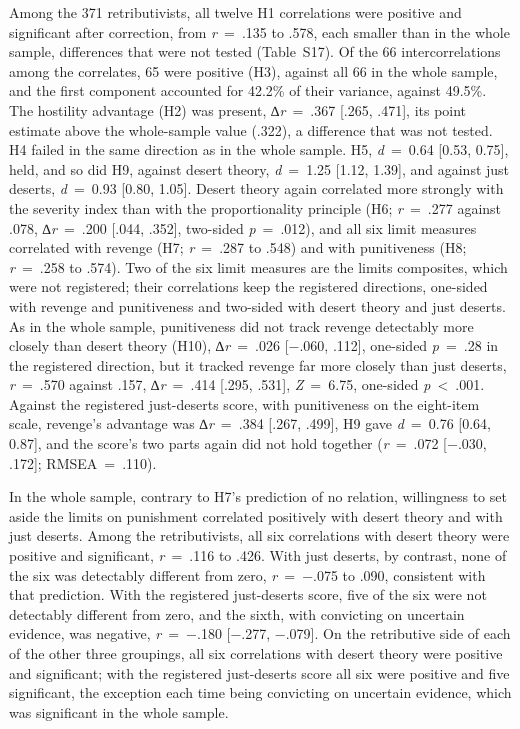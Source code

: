 Among the 371 retributivists, all twelve H1 correlations were positive and significant after correction, from \emph{r}~=~.135 to .578, each smaller than in the whole sample, differences that were not tested (Table~S17). Of the 66 intercorrelations among the correlates, 65 were positive (H3), against all 66 in the whole sample, and the first component accounted for 42.2\% of their variance, against 49.5\%. The hostility advantage (H2) was present, ∆\emph{r}~=~.367 {[}.265, .471{]}, its point estimate above the whole-sample value (.322), a difference that was not tested. H4 failed in the same direction as in the whole sample. H5, \emph{d}~=~0.64 {[}0.53, 0.75{]}, held, and so did H9, against desert theory, \emph{d}~=~1.25 {[}1.12, 1.39{]}, and against just deserts, \emph{d}~=~0.93 {[}0.80, 1.05{]}. Desert theory again correlated more strongly with the severity index than with the proportionality principle (H6; \emph{r}~=~.277 against .078, ∆\emph{r}~=~.200 {[}.044, .352{]}, two-sided \emph{p}~=~.012), and all six limit measures correlated with revenge (H7; \emph{r}~=~.287 to .548) and with punitiveness (H8; \emph{r}~=~.258 to .574). Two of the six limit measures are the limits composites, which were not registered; their correlations keep the registered directions, one-sided with revenge and punitiveness and two-sided with desert theory and just deserts. As in the whole sample, punitiveness did not track revenge detectably more closely than desert theory (H10), ∆\emph{r}~=~.026 {[}−.060, .112{]}, one-sided \emph{p}~=~.28 in the registered direction, but it tracked revenge far more closely than just deserts, \emph{r}~=~.570 against .157, ∆\emph{r}~=~.414 {[}.295, .531{]}, \emph{Z}~=~6.75, one-sided \emph{p}~\textless{}~.001. Against the registered just-deserts score, with punitiveness on the eight-item scale, revenge's advantage was ∆\emph{r}~=~.384 {[}.267, .499{]}, H9 gave \emph{d}~=~0.76 {[}0.64, 0.87{]}, and the score's two parts again did not hold together (\emph{r}~=~.072 {[}−.030, .172{]}; RMSEA~=~.110).

In the whole sample, contrary to H7's prediction of no relation, willingness to set aside the limits on punishment correlated positively with desert theory and with just deserts. Among the retributivists, all six correlations with desert theory were positive and significant, \emph{r}~=~.116 to .426. With just deserts, by contrast, none of the six was detectably different from zero, \emph{r}~=~−.075 to .090, consistent with that prediction. With the registered just-deserts score, five of the six were not detectably different from zero, and the sixth, with convicting on uncertain evidence, was negative, \emph{r}~=~−.180 {[}−.277, −.079{]}. On the retributive side of each of the other three groupings, all six correlations with desert theory were positive and significant; with the registered just-deserts score all six were positive and five significant, the exception each time being convicting on uncertain evidence, which was significant in the whole sample.

